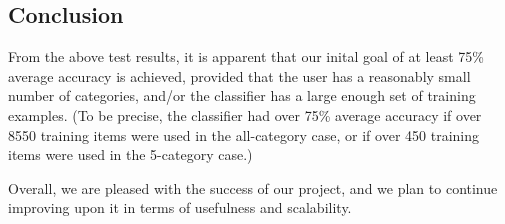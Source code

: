 \documentclass[letterpaper]{article}
\begin{document}
\subsection{Conclusion}
From the above test results, it is apparent that our inital goal of at least 75\% average accuracy is achieved, provided that the user has a reasonably small number of categories, and/or the classifier has a large enough set of training examples. (To be precise, the classifier had over 75\% average accuracy if over 8550 training items were used in the all-category case, or if over 450 training items were used in the 5-category case.)

Overall, we are pleased with the success of our project, and we plan to continue improving upon it in terms of usefulness and scalability.



\end{document}
